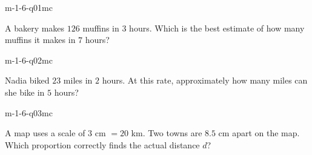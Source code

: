 

\begin{practiceQuestion}{m-1-6-q01}{mc}
\begin{questionText}
A bakery makes $126$ muffins in $3$ hours. Which is the best estimate of how many muffins it makes in $7$ hours?
\end{questionText}
\end{practiceQuestion}

\begin{practiceQuestion}{m-1-6-q02}{mc}
\begin{questionText}
Nadia biked $23$ miles in $2$ hours. At this rate, approximately how many miles can she bike in $5$ hours?
\end{questionText}
\end{practiceQuestion}

\begin{practiceQuestion}{m-1-6-q03}{mc}
\begin{questionText}
A map uses a scale of $3$ cm $= 20$ km. Two towns are $8.5$ cm apart on the map. Which proportion correctly finds the actual distance $d$?
\end{questionText}
\end{practiceQuestion}

